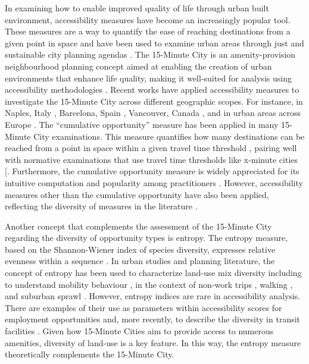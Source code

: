 \documentclass[
  authoryear,
  preprint,
  3p]{elsarticle}
\begin{document}
In examining how to enable improved quality of life through urban built
environment, accessibility measures have become an increasingly popular
tool. These measures are a way to quantify the ease of reaching
destinations from a given point in space and have been used to examine
urban areas through just and sustainable city planning agendas
\citep{vale2023accessibility, handyAccessibilityIdeaWhose2020}. The
15-Minute City is an amenity-provision neighbourhood planning concept
aimed at enabling the creation of urban environments that enhance life
quality, making it well-suited for analysis using accessibility
methodologies \citep{guzmanProximityEnoughCritical2024}. Recent works
have applied accessibility measures to investigate the 15-Minute City
across different geographic scopes. For instance, in Naples, Italy
\citep{gaglioneUrbanAccessibility15minute2022}, Barcelona, Spain
\citep{graellsCityCitiesMeasuring2021}, Vancouver, Canada
\citep{hosford15minuteCityReach2022}, and in urban areas across Europe
\citep{vale2023accessibility}. The ``cumulative opportunity'' measure
has been applied in many 15-Minute City examinations. This measure
quantifies how many destinations can be reached from a point in space
within a given travel time threshold , pairing well with normative
examinations \citep[see][]{paez_measuring_2012} that use travel time
thresholds like x-minute cities {[}\citet{logan_xminute_2022}.
Furthermore, the cumulative opportunity measure is widely appreciated
for its intuitive computation and popularity among practitioners
\citep{handyAccessibilityIdeaWhose2020, handyMeasuringAccessibilityExploration1997, chengInvestigatingWalkingAccessibility2019}.
However, accessibility measures other than the cumulative opportunity
have also been applied, reflecting the diversity of measures in the
literature \citep{guzmanProximityEnoughCritical2024}.

Another concept that complements the assessment of the 15-Minute City
regarding the diversity of opportunity types is entropy. The entropy
measure, based on the Shannon-Wiener index of species diversity,
expresses relative evenness within a sequence
\citep{whittaker1972evolution}. In urban studies and planning
literature, the concept of entropy has been used to characterize
land-use mix diversity
\citep{frankLinkingObjectivelyMeasured2005, ewingTravelBuiltEnvironment2010a, moniruzzaman_accessibility_2012}
including to understand mobility behaviour
\citep{mcbride2020exploration, montero2023applying, montero2023role}, in
the context of non-work trips \citep{cerveroTravelDemand3Ds1997},
walking
\citep{luUrbanDensityDiversity2017, mavoaIdentifyingAppropriateLanduse2018},
and suburban sprawl \citep{randallGISBasedLand2015}. However, entropy
indices are rare in accessibility analysis. There are examples of their
use as parameters within accessibility scores for employment
opportunities
\citep{chengMeasuringUrbanJob2013, daiIncorporatingJobDiversity2018}
and, more recently, to describe the diversity in transit facilities
\citep{yinIncorporatingFacilityDiversity2024}. Given how 15-Minute
Cities aim to provide access to numerous amenities, diversity of
land-use is a key feature. In this way, the entropy measure
theoretically complements the 15-Minute City.
\end{document}

